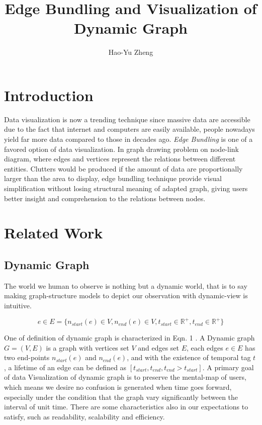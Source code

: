 \documentclass{article}
\title{Edge Bundling and Visualization of Dynamic Graph}
\author{Hao-Yu Zheng }
\date{}
\begin{document}
\maketitle
\begin{abstract}
    
\end{abstract}

\section{Introduction}
Data visualization is now a trending technique since massive data are accessible due to the fact that internet and computers are easily available, people nowadays yield far more data compared to those in decades ago. \emph{Edge Bundling} is one of a favored option of data visualization. In graph drawing problem on node-link diagram, where edges and vertices represent the relations between different entities. Clutters would be produced if the amount of data are proportionally larger than the area to display\cite{TAXONOMY}, edge bundling technique provide visual simplification without losing structural meaning of adapted graph, giving users better insight and comprehension to the relations between nodes.
\par 


\section{Related Work}
\subsection{Dynamic Graph}
The world we human to observe is nothing but a dynamic world, that is to say making graph-structure models to depict our observation with dynamic-view is intuitive.

\begin{equation}
e \in E = \{n_{start}(e) \in V, n_{end}(e) \in V, t_{start} \in \mathbb{R}^+, t_{end}\in\mathbb{R}^+\}
\end{equation}


One of definition of dynamic graph is characterized in Eqn. 1 \cite{BUNDLED_DG} . A Dynamic graph $G = (V,E)$ is a graph with vertices set $V$ and edges set $E$, each edges $e \in E$ has two end-points $n_{start}(e)$ and $n_{end}(e)$, and with the existence of temporal tag $t$, a lifetime of an edge can be defined as $[t_{start},t_{end},t_{end}>t_{start}]$. A primary goal of data Visualization of dynamic graph is to preserve the mental-map of users\cite{SOTA_DG}, which means we desire no confusion is generated when time goes forward, especially under the condition that the graph vary significantly between the interval of unit time. There are some characteristics also in our expectations to satisfy, such as readability, scalability and efficiency. 
\end{document}

